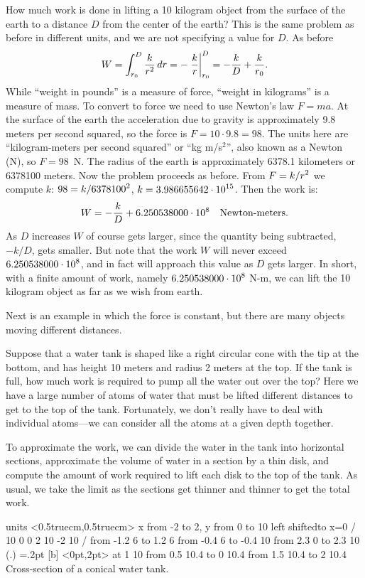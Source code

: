 \example How much work is done in lifting a 10 kilogram object from the
surface of the earth to a distance $D$ from the center of the earth?
This is the same problem as before in different units, and we are not
specifying a value for $D$. As before
$$W=\int_{r_0}^{D} {k\over r^2}\,dr= -\left.{k\over
  r}\right|_{r_0}^{D}=-{k\over D}+{k\over r_0}.$$ 
While ``weight in pounds'' is a measure of force, ``weight in
kilograms'' is a measure of mass. To convert to force we need to use
Newton's law $F=ma$. At the surface of the earth the acceleration due
to gravity is approximately 9.8 meters per second squared, so the
force is $F=10\cdot 9.8=98$. The units here are ``kilogram-meters per
second squared'' or ``kg m/s$^2$'', also known as a
Newton (N), so $F=98$~N.  The radius of the earth is
approximately 6378.1 kilometers or 6378100 meters.
Now the problem proceeds as before. From
$\displaystyle F=k/r^2$ we compute $k$:
$\displaystyle 98=k/6378100^2$, $\displaystyle k= 3.986655642\cdot 10^{15}$. Then the work is:
$$W=-{k\over D}+6.250538000\cdot 10^8\quad\hbox{Newton-meters.}$$
As $D$ increases $W$ of course gets larger, since the quantity being
subtracted, $-k/D$, gets smaller. But note that the work $W$ will
never exceed $\displaystyle 6.250538000\cdot 10^8$, and in fact will approach this
value as $D$ gets larger. In short, with a finite amount of work, namely
$\displaystyle 6.250538000\cdot 10^8$ N-m, we can lift the 10 kilogram object as far
as we wish from earth.
\endexample

Next is an example in which the force is constant, but there are many
objects moving different distances.

\example Suppose that a water tank is shaped like a right circular
cone with the tip at the bottom, and has height 10 meters and radius 2
meters at the top. If the tank is full, how much work is required
to pump all the water out over the top? Here we have a large number of
atoms of water that must be lifted different distances to get to the
top of the tank. Fortunately, we don't really have to deal with
individual atoms---we can consider all the atoms at a given depth
together. 

To approximate the work, we can divide the water in the tank into
horizontal sections, approximate the volume of water in a section by a
thin disk, and compute the amount of work required to lift each disk
to the top of the tank. As usual, we take the limit as the sections
get thinner and thinner to get the total work.

\figure
\texonly
\vbox{\beginpicture
\normalgraphs
\ninepoint
\setcoordinatesystem units <0.5truecm,0.5truecm>
\setplotarea x from -2 to 2, y from 0 to 10
\axis left shiftedto x=0 /
 10 0 0 2 10 -2 10 /
\setdashes
\putrule from -1.2 6 to 1.2 6
 from -0.4 6 to -0.4 10
 from 2.3 0 to 2.3 10
\setplotsymbol ({\teeny.})
\plotsymbolspacing=.2pt
 [b] <0pt,2pt> at 1 10
\arrow <2pt> [0.7, 2] from 0.5 10.4 to 0 10.4
\arrow <2pt> [0.7, 2] from 1.5 10.4 to 2 10.4
\endpicture}
\endtexonly
{}
\begincaption
Cross-section of a conical water tank.
\endcaption
\endfigure

